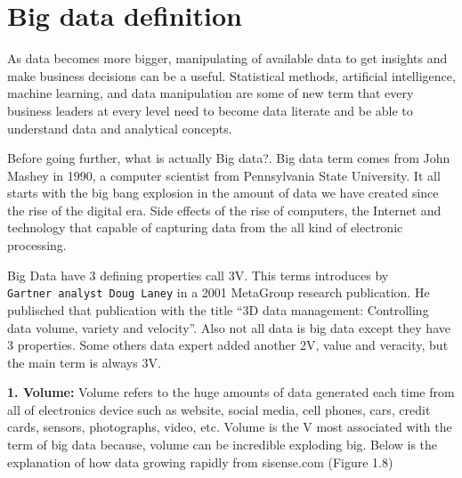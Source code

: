 \documentclass[]{book}
\begin{document}
\section{Big data definition}\label{big-data-definition}

As data becomes more bigger, manipulating of available data to get
insights and make business decisions can be a useful. Statistical
methods, artificial intelligence, machine learning, and data
manipulation are some of new term that every business leaders at every
level need to become data literate and be able to understand data and
analytical concepts.

Before going further, what is actually Big data?. Big data term comes
from John Mashey in 1990, a computer scientist from Pennsylvania State
University. It all starts with the big bang explosion in the amount of
data we have created since the rise of the digital era. Side effects of
the rise of computers, the Internet and technology that capable of
capturing data from the all kind of electronic processing.

Big Data have 3 defining properties call 3V. This terms introduces by
\texttt{Gartner\ analyst\ Doug\ Laney} in a 2001 MetaGroup research
publication. He publisched that publication with the title ``3D data
management: Controlling data volume, variety and velocity''. Also not
all data is big data except they have 3 properties. Some others data
expert added another 2V, value and veracity, but the main term is always
3V.

\textbf{1. Volume:} Volume refers to the huge amounts of data generated
each time from all of electronics device such as website, social media,
cell phones, cars, credit cards, sensors, photographs, video, etc.
Volume is the V most associated with the term of big data because,
volume can be incredible exploding big. Below is the explanation of how
data growing rapidly from sisense.com (Figure 1.8)
\end{document}
